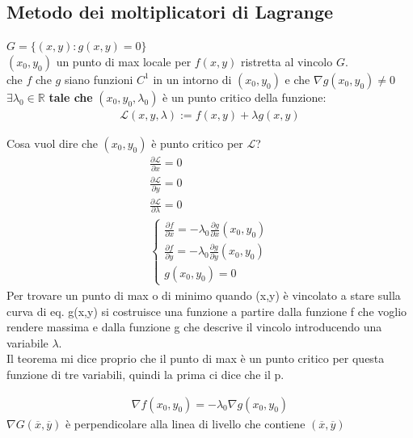 \documentclass[a4paper, oneside]{article}
\begin{document}
        \subsection{Metodo dei moltiplicatori di Lagrange}
        \begin{theorem}
             $G = \{(x,y): g(x,y) = 0\}$\\
             $(x_0,y_0)$ un punto di max locale per $f(x,y)$ ristretta al vincolo $G$.\\
             che  $f$ che $g$ siano funzioni $C^1$ in un intorno di $(x_0,y_0)$ e che $\nabla g(x_0,y_0) \neq 0$\\
             $\exists \lambda_0 \in \mathbb{R}$ \textbf{tale che} $(x_0,y_0,\lambda_0)$ è un punto critico della funzione:
            \begin{gather*}
                \mathcal{L}(x,y,\lambda) := f(x,y) + \lambda g(x,y)
            \end{gather*}
        \end{theorem}
        Cosa vuol dire che $(x_0,y_0)$ è punto critico per $\mathcal{L}$?
        \begin{gather*}
            \frac{\partial \mathcal{L}}{\partial x}=0\\
            \frac{\partial \mathcal{L}}{\partial y}=0\\
            \frac{\partial \mathcal{L}}{\partial \lambda}=0\\
            \begin{cases}
                \frac{\partial f}{\partial x} = -\lambda_0 \frac{\partial g}{\partial x}(x_0,y_0)\\
                \frac{\partial f}{\partial y} = -\lambda_0 \frac{\partial g}{\partial y}(x_0,y_0)\\
                g(x_0,y_0) = 0
            \end{cases}
        \end{gather*} 
        Per trovare un punto di max o di minimo quando (x,y) è vincolato a stare sulla curva di eq. g(x,y) si costruisce una funzione a partire dalla funzione f che voglio rendere massima e dalla funzione g che descrive il vincolo introducendo una variabile $\lambda$.\\
        Il teorema mi dice proprio che il punto di max è un punto critico per questa funzione di tre variabili, quindi la prima ci dice che il p.
        \begin{proposition}
            \begin{gather*}
                \nabla f(x_0,y_0) = -\lambda_0 \nabla g(x_0,y_0)
            \end{gather*}
            $\nabla G(\overline{x}, \overline{y}) $ è perpendicolare alla linea di livello che contiene $(\overline{x}, \overline{y})$
        \end{proposition}
\end{document}
